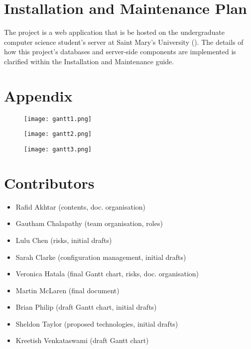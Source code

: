 \documentclass[11pt]{article}
\newcommand{\MYhref}[3][blue]{\href{#2}{\color{#1}{#3}}}%
\begin{document}
\section{Installation and Maintenance Plan}

The project is a web application that is be hosted on the undergraduate computer science student's
server at Saint Mary's University (\MYhref{https://ugdev.cs.smu.ca/~group4}{link}). The details of
how this project's databases and server-side components are implemented is clarified within the
Installation and Maintenance guide.

\pagebreak
\section*{Appendix}

\begin{figure}[H]
\texttt{[image: gantt1.png]}
\centering
\end{figure}

\begin{figure}[H]
\texttt{[image: gantt2.png]}
\centering
\end{figure}

\begin{figure}[H]
\texttt{[image: gantt3.png]}
\centering
\end{figure}

\pagebreak

\section*{Contributors}

\begin{itemize}
    \item Rafid Akhtar (contents, doc. organisation)
    \item Gautham Chalapathy (team organisation, roles)
    \item Lulu Chen (risks, initial drafts)
    \item Sarah Clarke (configuration management, initial drafts)
    \item Veronica Hatala (final Gantt chart, risks, doc. organisation)
    \item Martin McLaren (final document)
    \item Brian Philip (draft Gantt chart, initial drafts)
    \item Sheldon Taylor (proposed technologies, initial drafts)
    \item Kreetish Venkataswami (draft Gantt chart)
\end{itemize}
\end{document}
